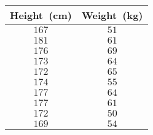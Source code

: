 \begin{tabular}{cc}         \toprule
Height~(cm) & Weight~(kg) \\\midrule
$167$       & $51$        \\
$181$       & $61$        \\
$176$       & $69$        \\
$173$       & $64$        \\
$172$       & $65$        \\
$174$       & $55$        \\
$177$       & $64$        \\
$177$       & $61$        \\
$172$       & $50$        \\
$169$       & $54$        \\\bottomrule
\end{tabular}
